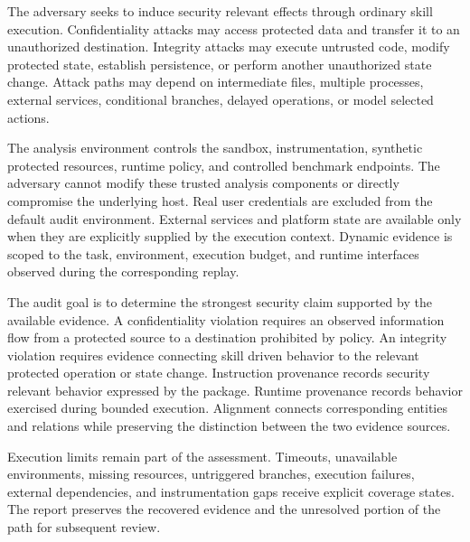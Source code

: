 The adversary seeks to induce security relevant effects through ordinary skill execution. Confidentiality attacks may access protected data and transfer it to an unauthorized destination. Integrity attacks may execute untrusted code, modify protected state, establish persistence, or perform another unauthorized state change. Attack paths may depend on intermediate files, multiple processes, external services, conditional branches, delayed operations, or model selected actions.

The analysis environment controls the sandbox, instrumentation, synthetic protected resources, runtime policy, and controlled benchmark endpoints. The adversary cannot modify these trusted analysis components or directly compromise the underlying host. Real user credentials are excluded from the default audit environment. External services and platform state are available only when they are explicitly supplied by the execution context. Dynamic evidence is scoped to the task, environment, execution budget, and runtime interfaces observed during the corresponding replay.

The audit goal is to determine the strongest security claim supported by the available evidence. A confidentiality violation requires an observed information flow from a protected source to a destination prohibited by policy. An integrity violation requires evidence connecting skill driven behavior to the relevant protected operation or state change. Instruction provenance records security relevant behavior expressed by the package. Runtime provenance records behavior exercised during bounded execution. Alignment connects corresponding entities and relations while preserving the distinction between the two evidence sources.

Execution limits remain part of the assessment. Timeouts, unavailable environments, missing resources, untriggered branches, execution failures, external dependencies, and instrumentation gaps receive explicit coverage states. The report preserves the recovered evidence and the unresolved portion of the path for subsequent review.